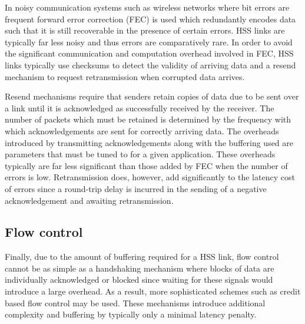 			In noisy communication systems such as wireless networks where bit errors
			are frequent forward error correction (FEC) is used which redundantly
			encodes data such that it is still recoverable in the presence of certain
			errors.  HSS links are typically far less noisy and thus errors are
			comparatively rare.  In order to avoid the significant communication and
			computation overhead involved in FEC, HSS links typically use checksums to
			detect the validity of arriving data and a resend mechanism to request
			retransmission when corrupted data arrives.
			
			Resend mechanisms require that senders retain copies of data due to be
			sent over a link until it is acknowledged as successfully received by the
			receiver. The number of packets which must be retained is determined by
			the frequency with which acknowledgements are sent for correctly arriving
			data. The overheads introduced by transmitting acknowledgements along with
			the buffering used are parameters that must be tuned to for a given
			application. These overheads typically are far less significant than those
			added by FEC when the number of errors is low. Retransmission does,
			however, add significantly to the latency cost of errors since a
			round-trip delay is incurred in the sending of a negative acknowledgement
			and awaiting retransmission.
		
		\subsection{Flow control}
			
			Finally, due to the amount of buffering required for a HSS link, flow
			control cannot be as simple as a handshaking mechanism where blocks of
			data are individually acknowledged or blocked since waiting for these
			signals would introduce a large overhead. As a result, more sophisticated
			schemes such as credit based flow control \cite{dally04} may be used.
			These mechanisms introduce additional complexity and buffering by
			typically only a minimal latency penalty.
